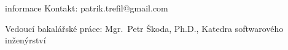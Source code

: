 \documentclass[portrait,a0paper,fontscale=0.25]{baposter}
\begin{document}
\begin{poster}
        \begin{posterbox}[column=1, name=information, below=conclusion]{informace}
            Kontakt: patrik.trefil@gmail.com

            \vspace{2mm}

            Vedoucí bakalářské práce: Mgr.\ Petr Škoda, Ph.D., Katedra softwarového inženýrství
        \end{posterbox}

    \end{poster}
\end{document}
